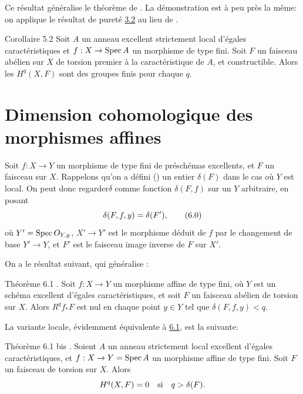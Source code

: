 \documentclass[10pt]{../fichiers-configuration-latex/smfart}
\begin{document}
Ce résultat généralise le théorème de . La démonstration est à
peu près la même: on applique le résultat de pureté
\hyperref[XIX.thm3.2]{3.2} au lieu de 
.

\begin{enonce*}{Corollaire 5.2}
Soit $A$ un anneau excellent strictement local d'égales
caractéristiques et $f:X\rightarrow \operatorname{Spec} A$ un morphisme de type
fini. Soit $F$ un faisceau abélien sur $X$ de torsion premier à la
caractéristique de $A$, et constructible. Alors les $H^{q}(X,F)$ sont
des groupes finis pour chaque $q$.
\end{enonce*}

\section{Dimension cohomologique des morphismes affines}

Soit $f:X\rightarrow Y$ un morphisme de type fini de préschémas
excellents, et $F$ un faisceau sur $X$. Rappelons qu'on a défini 
() un entier $\delta(F)$ dans le cas où $Y$ est local. On peut donc
regarder\pageoriginale $\delta$ comme fonction $\delta(F,f)$ sur un $Y$
arbitraire, en posant
\begin{equation*}
\delta(F,f,y)=\delta(F'){},\tag{6.0}
\end{equation*}
où $Y'=\operatorname{Spec} O_{Y,y}$, $X'\rightarrow Y'$ est le morphisme déduit de
$f$ par le changement de base $Y'\rightarrow Y$, et $F'$ est le
faisceau image inverse de $F$ sur $X'$.

On a le résultat suivant, qui généralise :

\begin{enonce*}{Théorème 6.1}
\footnotemark. Soit $f:X\rightarrow Y$ un morphisme affine de type
fini, où $Y$ est un schéma excellent d'égales caractéristiques, et
soit $F$ un faisceau abélien de torsion sur $X$. Alors
$R^{q}f_{\ast}F$ est nul en chaque point $y\in Y$ tel que $\delta(F,f,y)<q$.
\end{enonce*}

La variante locale, évidemment équivalente à \hyperref[XIX.thm6.1]{6.1}, est la suivante:

\begin{enonce*}{Théorème 6.1 bis}
\footnotemark[1]. Soient $A$ un anneau strictement local excellent
d'égales caractéristiques, et $f:X\rightarrow Y=\operatorname{Spec} A$ un morphisme
affine de type fini. Soit $F$ un faisceau de torsion sur $X$. Alors
$$
H^{q}(X,F)=0\quad\text{\rm si}\quad q>\delta(F){}.
$$
\end{enonce*}
\end{document}
